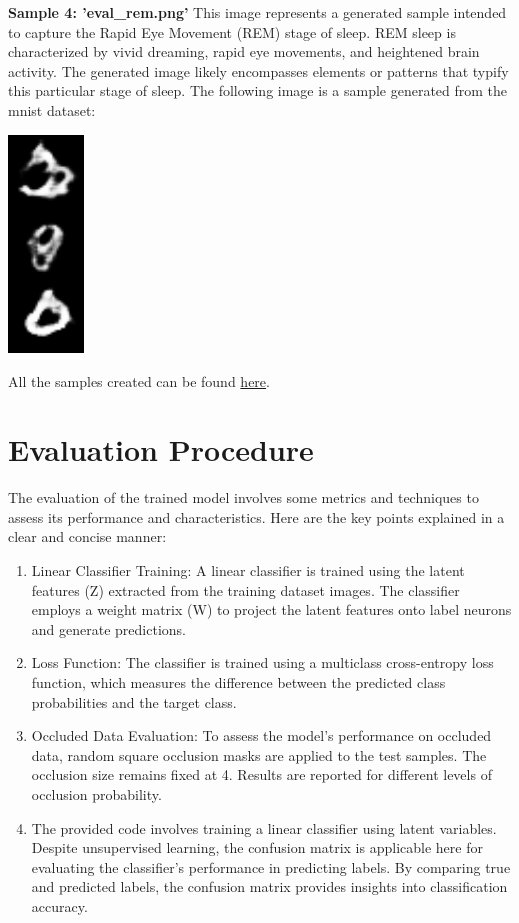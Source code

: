 \documentclass{midl} %
\begin{document}
\textbf{Sample 4: 'eval\_rem.png'}
This image represents a generated sample intended to capture the Rapid Eye Movement (REM) stage of sleep. REM sleep is characterized by vivid dreaming, rapid eye movements, and heightened brain activity. The generated image likely encompasses elements or patterns that typify this particular stage of sleep. The following image is a sample generated from the mnist dataset:
\begin{center}
\includegraphics[width=0.15\textwidth]{eval3_rem.png}
\end{center}

All the samples created can be found \href{https://drive.google.com/drive/folders/1ICiG1oI5mtNa3IMUPqH2Jn6dpg38qHH3}{here}.


\section{Evaluation Procedure}

The evaluation of the trained model involves some metrics and techniques to assess its performance and characteristics. Here are the key points explained in a clear and concise manner:

\begin{enumerate}
  \item Linear Classifier Training: A linear classifier is trained using the latent features (Z) extracted from the training dataset images. The classifier employs a weight matrix (W) to project the latent features onto label neurons and generate predictions.

  \item Loss Function: The classifier is trained using a multiclass cross-entropy loss function, which measures the difference between the predicted class probabilities and the target class.

  \item Occluded Data Evaluation: To assess the model's performance on occluded data, random square occlusion masks are applied to the test samples. The occlusion size remains fixed at 4. Results are reported for different levels of occlusion probability.
 
 \item The provided code involves training a linear classifier using latent variables. Despite unsupervised learning, the confusion matrix is applicable here for evaluating the classifier's performance in predicting labels. By comparing true and predicted labels, the confusion matrix provides insights into classification accuracy.
\end{enumerate}
\end{document}
